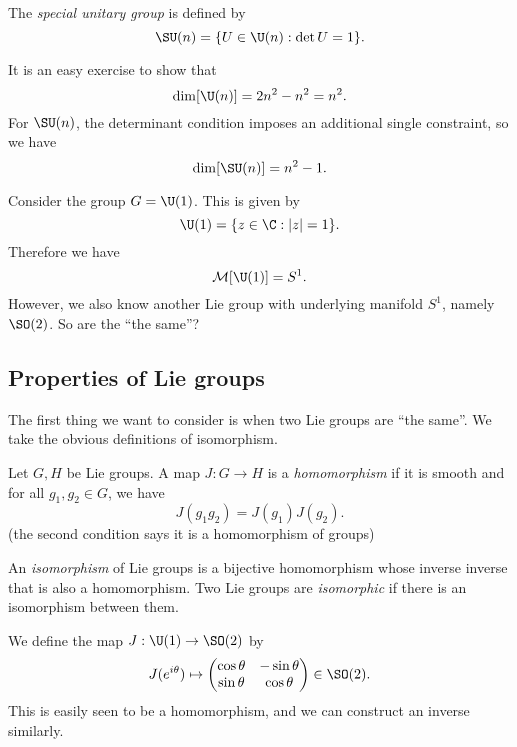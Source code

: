 \documentclass[a4paper]{article}
\begin{document}
\begin{defi}
  The \emph{special unitary group} is defined by
  \[
    \SU(n) = \{U \in \U(n): \det U = 1\}.
  \]
\end{defi}

It is an easy exercise to show that
\[
  \dim[\U(n)] = 2n^2 - n^2 = n^2.
\]
For $\SU(n)$, the determinant condition imposes an additional single constraint, so we have
\[
  \dim[\SU(n)] = n^2 - 1.
\]
\begin{eg}
  Consider the group $G = \U(1)$. This is given by
  \[
    \U(1) = \{z \in \C: |z| = 1\}.
  \]
  Therefore we have
  \[
    \mathcal{M}[\U(1)] = S^1.
  \]
  However, we also know another Lie group with underlying manifold $S^1$, namely $\SO(2)$. So are the ``the same''?
\end{eg}

\subsection{Properties of Lie groups}
The first thing we want to consider is when two Lie groups are ``the same''. We take the obvious definitions of isomorphism.
\begin{defi}
  Let $G, H$ be Lie groups. A map $J: G \to H$ is a \emph{homomorphism} if it is smooth and for all $g_1, g_2 \in G$, we have
  \[
    J(g_1 g_2) = J(g_1) J(g_2).
  \]
  (the second condition says it is a homomorphism of groups)
\end{defi}

\begin{defi}
  An \emph{isomorphism} of Lie groups is a bijective homomorphism whose inverse inverse that is also a homomorphism. Two Lie groups are \emph{isomorphic} if there is an isomorphism between them.
\end{defi}

\begin{eg}
  We define the map $J: \U(1) \to \SO(2)$ by
  \[
    J(e^{i\theta}) \mapsto
    \begin{pmatrix}
      \cos \theta & -\sin \theta\\
      \sin \theta & \cos \theta
    \end{pmatrix} \in \SO(2).
  \]
  This is easily seen to be a homomorphism, and we can construct an inverse similarly.
\end{eg}
\end{document}
